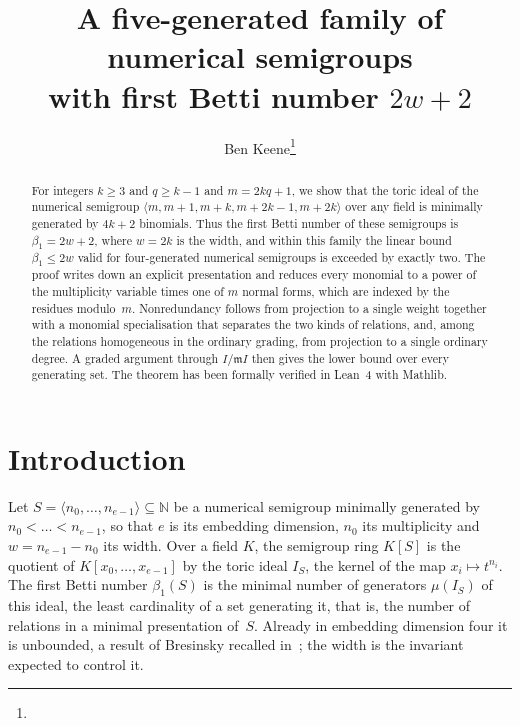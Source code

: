 \documentclass[11pt,letterpaper]{article}
\date{}
\title{A five-generated family of numerical semigroups\\ with first Betti number $2w+2$}
\author{Ben Keene\thanks{\red{[affiliation]}}}
\numberwithin{equation}{section}
\theoremstyle{plain}
\theoremstyle{remark}
\newcommand{\NN}{\mathbb{N}}
\newcommand{\mm}{\mathfrak{m}}
\begin{document}
\maketitle
\thispagestyle{plain}

\begin{abstract}
For integers $k\ge 3$ and $q\ge k-1$ and $m=2kq+1$, we show that the toric ideal of the numerical semigroup $\langle m,m+1,m+k,m+2k-1,m+2k\rangle$ over any field is minimally generated by $4k+2$ binomials. Thus the first Betti number of these semigroups is $\beta_1=2w+2$, where $w=2k$ is the width, and within this family the linear bound $\beta_1\le 2w$ valid for four-generated numerical semigroups is exceeded by exactly two. The proof writes down an explicit presentation and reduces every monomial to a power of the multiplicity variable times one of $m$ normal forms, which are indexed by the residues modulo~$m$. Nonredundancy follows from projection to a single weight together with a monomial specialisation that separates the two kinds of relations, and, among the relations homogeneous in the ordinary grading, from projection to a single ordinary degree. A graded argument through $I/\mm I$ then gives the lower bound over every generating set. The theorem has been formally verified in Lean~4 with Mathlib.
\end{abstract}

\section{Introduction}\label{sec:intro}

Let $S=\langle n_0,\dots,n_{e-1}\rangle\subseteq\NN$ be a numerical semigroup minimally generated by $n_0<\dots<n_{e-1}$, so that $e$ is its embedding dimension, $n_0$ its multiplicity and $w=n_{e-1}-n_0$ its width. Over a field $K$, the semigroup ring $K[S]$ is the quotient of $K[x_0,\dots,x_{e-1}]$ by the toric ideal $I_S$, the kernel of the map $x_i\mapsto t^{n_i}$. The first Betti number $\beta_1(S)$ is the minimal number of generators $\mu(I_S)$ of this ideal, the least cardinality of a set generating it, that is, the number of relations in a minimal presentation of~$S$. Already in embedding dimension four it is unbounded, a result of Bresinsky recalled in~\cite{CMS24}; the width is the invariant expected to control it.
\end{document}

